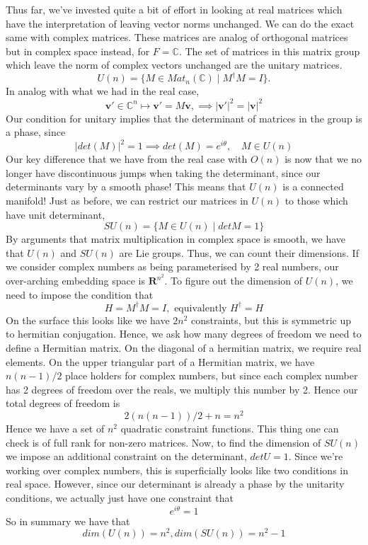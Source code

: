 Thus far, we've invested quite a bit of effort in looking at real matrices which have the interpretation of leaving vector norms unchanged. We can do the exact same with complex matrices. These matrices are analog of orthogonal matrices but in complex space instead, for $F = \mathbb{C}$. The set of matrices in this matrix group which leave the norm of complex vectors unchanged are the unitary matrices. 
\[
	U(n) = \{ M \in Mat_n (\mathbb{C}) \mid M^{\dagger} M = I \}. 
\] In analog with what we had in the real case, 
\[ 	
	\mathbf{v}' \in \mathbb{C}^n \mapsto \mathbf{v}' = M\mathbf{ v}, \implies  |\mathbf{v}'|^2 = |\mathbf{v}|^2 
\] Our condition for unitary implies that the determinant of matrices in the group is a phase, since 
\[ 
	| det ( M ) |^2 = 1 \implies det ( M) = e^{ i \theta}, \quad M \in U ( n) 
\] Our key difference that we have from the real case with $O(n)$ is now that we no longer have discontinuous jumps when taking the determinant, since our determinants vary by a smooth phase! This means that $U( n)$ is a connected manifold! Just as before, we can restrict our matrices in $U( n )$ to those which have unit determinant, 
\[ 
	SU ( n ) = \{ M \in U ( n ) \mid det M = 1\} 
\] 
By arguments that matrix multiplication in complex space is smooth, we have that $U ( n)$ and $SU ( n) $ are Lie groups. Thus, we can count their dimensions. If we consider complex numbers as being parameterised by 2 real numbers, our over-arching embedding space is $\mathbf{R}^{ n^2 } $. To figure out the dimension of $U (n)$, we need to impose the condition that 
\[ 
	 H = M^\dagger M  = I, \text{ equivalently } H^\dagger = H 
\]  On the surface this looks like we have $2 n^2 $ constraints, but this is symmetric up to hermitian conjugation. Hence, we ask how many degrees of freedom we need to define a Hermitian matrix. On the diagonal of a hermitian matrix, we require real elements. On the upper triangular part of a Hermitian matrix, we have $n (n -1 ) /2 $ place holders for complex numbers, but since each complex number has 2 degrees of freedom over the reals, we multiply this number by 2. Hence our total degrees of freedom is 
\[ 
	2 ( n ( n  -1) ) / 2 + n  = n^2 
\] Hence we have a set of $n^2$ quadratic constraint functions. This thing one can check is of full rank for non-zero matrices. Now, to find the dimension of $SU ( n)$ we impose an additional constraint on the determinant, 
$det U = 1$. Since we're working over complex numbers, this is superficially looks like two conditions in real space. However, since our determinant is already a phase by the unitarity conditions, we actually just have one constraint that 
\[ 
	e^{ i \theta } = 1 
\] So in summary we have that 
\[ 
	dim ( U ( n)) = n^2, dim ( SU ( n)) = n^2  - 1
\] 

